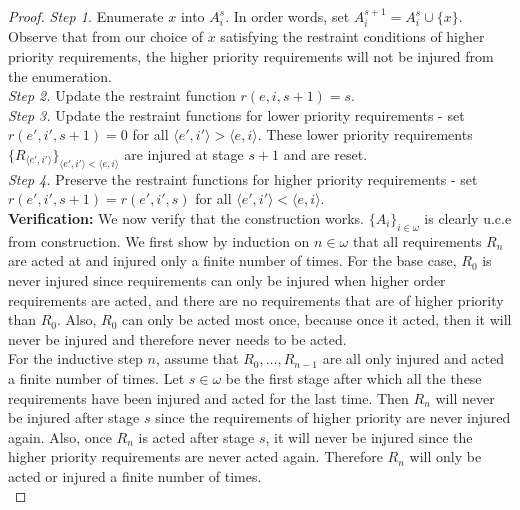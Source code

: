 \documentclass{article}
\begin{document}
\begin{enumerate}[label={(\roman*)}]
\begin{proof}
        \textit{Step 1.} Enumerate $x$ into $A_i^s$. In order words, set
        $A_i^{s+1}=A_i^s\cup\{x\}$. Observe that from our choice of $x$
        satisfying the restraint conditions of higher priority
        requirements, the higher priority requirements will not be injured
        from the enumeration. \\

        \textit{Step 2.} Update the restraint function $r(e,i,s+1)=s$. \\

        \textit{Step 3.} Update the restraint functions for lower priority
        requirements - set $r(e',i',s+1)=0$ for all $\langle e',i'\rangle
        >\langle e,i\rangle$. These lower priority requirements
        $\{R_{\langle e',i'\rangle}\}_{\langle e',i'\rangle <\langle
        e,i\rangle}$ are injured at stage $s+1$ and are reset. \\

        \textit{Step 4.} Preserve the restraint functions for higher
        priority requirements - set $r(e',i',s+1)=r(e',i',s)$ for all
        $\langle e',i'\rangle <\langle e,i\rangle$. \\

        \textbf{Verification:} We now verify that the construction works.
        $\{A_i\}_{i\in\omega}$ is clearly u.c.e from construction. We first
        show by induction on $n\in\omega$ that all
        requirements $R_{n}$ are acted at and injured
        only a finite number of times. For the base case, $R_0$ is never
        injured since requirements can only be injured when higher order
        requirements are acted, and there are no requirements that are
        of higher priority than $R_0$. Also, $R_0$ can only be acted
        most once, because once it acted, then it will never be
        injured and therefore never needs to be acted. \\

        For the inductive step $n$, assume that $R_0,\ldots,R_{n-1}$ are
        all only injured and acted a finite number of times. Let
        $s\in\omega$ be the first stage after which all the these
        requirements have been injured and acted for the last time.
        Then $R_n$ will never be injured after stage $s$ since the
        requirements of higher priority are never injured again.
        Also, once $R_n$ is acted after stage $s$, it will never be
        injured since the higher priority requirements are never acted
        again. Therefore $R_n$ will only be acted or injured a finite
        number of times. \\


\end{proof}
\end{enumerate}
\end{document}
